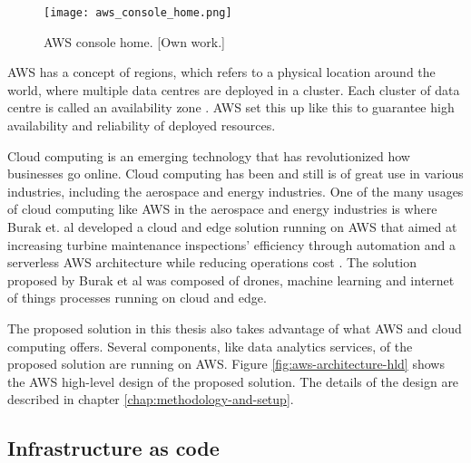 \begin{figure}[H]
    \centering \texttt{[image: aws\_console\_home.png]}
    \caption{AWS console home. [Own work.]}
    \label{fig:aws-console-home}
\end{figure}

AWS has a concept of regions, which refers to a physical location around the world, where multiple data centres are deployed in a cluster. Each cluster of data centre is called an availability zone \cite{awsregionsandazs}. AWS set this up like this to guarantee high availability and reliability of deployed resources.


Cloud computing is an emerging technology that has revolutionized how businesses go online. Cloud computing has been and still is of great use in various industries, including the aerospace and energy industries. One of the many usages of cloud computing like AWS in the aerospace and energy industries is where Burak et. al developed a cloud and edge solution running on AWS that aimed at increasing turbine maintenance inspections' efficiency through automation and a serverless AWS architecture while reducing operations cost \cite{burakawswindfarm2021}. The solution proposed by Burak et al was composed of drones, machine learning and internet of things processes running on cloud and edge.

The proposed solution in this thesis also takes advantage of what AWS and cloud computing offers. Several components, like data analytics services, of the proposed solution are running on AWS. Figure \ref{fig:aws-architecture-hld} shows the AWS high-level design of the proposed solution. The details of the design are described in chapter \ref{chap:methodology-and-setup}.




\subsection{Infrastructure as code}
\label{subsec:iac}

